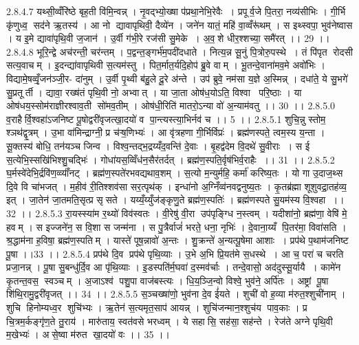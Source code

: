 2.8.4.7
यथ्सी॒व्वँरि॑ष्ठे बृह॒ती वि॑मि॒न्वन्न् । नृ॒वद्भ्यो॒ख्षा प॑प्रथा॒नेभि॒रेवैः । प्रपूर्व॒जे पि॒तरा॒ नव्य॑सीभिः । गी॒र्भि कृ॑णुध्व॒॒ सद॑ने ऋ॒तस्य॑ । आ नो द्यावापृथिवी॒ दैव्ये॑न । जने॑न यातं॒ महि॑ वा॒व्वँरू॑थम् । स इथ्स्वपा॒ भुव॑नेष्वास । य इ॒मे द्यावा॑पृथि॒वी ज॒जान॑ । उ॒र्वी ग॑भी॒रे रज॑सी सु॒मेके । अ॒व॒॒शे धीर॒श्शच्या॒ समै॑रत् ।। 29 ।।
2.8.4.8
भूरि॒न्द्वे अच॑रन्ती॒ चर॑न्तम् । प॒द्वन्त॒ङ्गर्भ॑म॒पदी॑दधाते । नित्य॒न्न सू॒नुं पि॒त्रोरु॒पस्थे । तं पि॑पृत रोदसी सत्य॒वाचम् । इ॒दन्द्या॑वापृथिवी स॒त्यम॑स्तु । पित॒र्मात॒र्यदि॒होप॑ ब्रु॒वे वाम् । भू॒तन्दे॒वाना॑मव॒मे अवो॑भिः । विद्यामे॒षव्वृँ॒जन॑ञ्जी॒र- दा॑नुम् । उ॒र्वी पृ॒थ्वी ब॑हु॒ले दू॒रे अ॑न्ते । उप॑ ब्रुवे॒ नम॑सा य॒ज्ञे अ॒स्मिन्न् । दधा॑ते॒ ये सु॒भगे॑ सु॒प्रतूर्ती । द्यावा॒ रख्ष॑तं पृथि॒वी नो॒ अभ्वात् । या जा॒ता ओष॑ध॒योऽति॒ विश्वा परि॒ष्ठाः । या ओष॑धय॒स्सोम॑राज्ञीरश्वाव॒ती सो॑मव॒तीम् । ओष॑धी॒रिति॑ मातरो॒ऽन्या वो॑ अ॒न्याम॑वतु ।। 30 ।।
2.8.5.0
व॒राहैर्वि॒श्वहा॑ऽजनिष्ट पू॒षोद्वरी॑वृजत्खा॒दयो॑ व पा॒न्त्यस्त्या॒भिर्नव॑ च ।। 5 ।।
2.8.5.1
शुचि॒न्नु स्तोम॒॒ श्ञथ॑द्वृ॒त्रम् । उ॒भा वा॑मिन्द्राग्नी॒ प्र च॑ऱ्ष॒णिभ्यः॑ । आ वृ॑त्रहणा गी॒र्भिर्विप्रः॑ । ब्रह्म॑णस्पते॒ त्वम॒स्य य॒न्ता । सू॒क्तस्य॑ बोधि॒ तन॑यञ्च जिन्व । विश्व॒न्तद्भ॒द्रय्यँद॒वन्ति॑ दे॒वाः । बृ॒हद्व॑देम वि॒दथे॑ सु॒वीराः । स ई॑ स॒त्येभि॒स्सखि॑भिश्शु॒चद्भिः॑ । गोधा॑यस॒व्विँध॑न॒सैर॑तर्दत् । ब्रह्म॑ण॒स्पति॒र्वृष॑भिर्व॒राहैः ।। 31 ।।
2.8.5.2
घ॒र्मस्वे॑देभि॒र्द्रवि॑ण॒व्व्याँ॑नट् । ब्रह्म॑ण॒स्पते॑रभवद्यथाव॒शम् । स॒त्यो म॒न्युर्महि॒ कर्मा॑ करिष्य॒तः । यो गा उ॒दाज॒थ्स दि॒वे वि चा॑भजत् । म॒हीव॑ री॒तिश्शव॑सा सर॒त्पृथ॑क् । इन्धा॑नो अ॒ग्निँव्व॑नवद्वनुष्य॒तः । कृ॒तब्र॑ह्मा शूशुवद्रा॒तह॑व्य॒ इत् । जा॒तेन॑ जा॒तमति॒सृत्प्र सृ॑सते । यय्यँ॒य्युँज॑ङ्कृणु॒ते ब्रह्म॑ण॒स्पतिः॑ । ब्रह्म॑णस्पते सु॒यम॑स्य वि॒श्वहा ।। 32 ।।
2.8.5.3
रा॒यस्स्या॑म र॒थ्यो॑ विव॑स्वतः । वी॒रेषु॑ वी॒रा उप॑पृङ्ग्धि न॒स्त्वम् । यदीशा॑नो॒ ब्रह्म॑णा॒ वेषि॑ मे॒ हवम् । स इज्जने॑न॒ स वि॒शा स जन्म॑ना । स पु॒त्रैर्वाजं॑ भरते॒ धना॒ नृभिः॑ । दे॒वाना॒य्यँ पि॒तर॑मा॒ विवा॑सति । श्र॒द्धाम॑ना ह॒विषा॒ ब्रह्म॑ण॒स्पतिम् । यास्ते॑ पूष॒न्नावो॑ अ॒न्तः । शु॒क्रन्ते॑ अ॒न्यत्पू॒षेमा आशाः । प्रप॑थे प॒थाम॑जनिष्ट पू॒षा ।।33 ।।
2.8.5.4
प्रप॑थे दि॒व प्रप॑थे पृथि॒व्याः । उ॒भे अ॒भि प्रि॒यत॑मे स॒धस्थे । आ च॒ परा॑ च चरति प्रजा॒नन्न् । पू॒षा सु॒बन्धु॑र्दि॒व आ पृ॑थि॒व्याः । इ॒डस्पति॑र्म॒घवा॑ द॒स्मव॑र्चाः । तन्दे॒वासो॒ अद॑दुस्सू॒र्यायै । कामे॑न कृ॒तन्त॒वस॒॒ स्वञ्चम् । अ॒जाऽश्व॑ पशु॒पा वाज॑बस्त्यः । धि॒य॒ञ्जि॒न्वो विश्वे॒ भुव॑ने॒ अर्पि॑तः । अष्ट्रां पू॒षा शि॑थि॒रामु॒द्वरी॑वृजत् ।। 34 ।।
2.8.5.5
स॒ञ्चख्षा॑णो॒ भुव॑ना दे॒व ई॑यते । शुची॑ वो ह॒व्या म॑रुत॒श्शुची॑नाम् । शुचि॑ हिनोम्यध्व॒र शुचि॑भ्यः । ऋ॒तेन॑ स॒त्यमृत॒साप॑ आयन्न् । शुचि॑जन्मान॒श्शुच॑य पाव॒काः । प्र चि॒त्रम॒र्कङ्गृ॑ण॒ते तु॒राय॑ । मारु॑ताय॒ स्वत॑वसे भरध्वम् । ये सहा॑सि॒ सह॑सा॒ सह॑न्ते । रेज॑ते अग्ने पृथि॒वी म॒खेभ्यः॑ । असे॒ष्वा म॑रुत खा॒दयो॑ वः ।। 35 ।।

